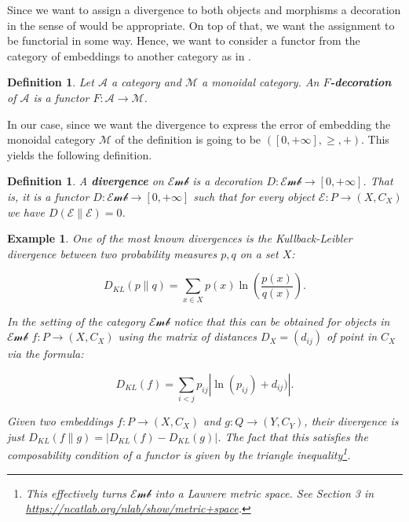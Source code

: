 \documentclass[10pt,a4paper]{elsarticle}
\newcommand{\Emb}{\mathcal{Emb}}
\newtheorem{exa}[theorem]{Example}
\newtheorem{definition}[theorem]{Definition}
\begin{document}
Since we want to assign a divergence to both objects and morphisms a decoration in the sense of  \cite{fong2015decorated,baez2021structured} would be appropriate. On top of that, we want the assignment to be functorial in some way. Hence, we want to consider a functor from the category of embeddings to another category as in \cite{AFH}. 

\begin{definition}\label{def:deco}
	Let $\mathcal{A}$ a category and $\mathcal{M}$ a monoidal category. An $F$\textbf{-decoration} of $\mathcal{A}$ is a functor $F\colon \mathcal{A}\to \mathcal{M}$.  
\end{definition}

In our case, since we want the divergence to express the error of embedding the monoidal category $\mathcal{M}$ of the definition is going to be $([0,+\infty],\geq, +)$. This yields the following definition.

\begin{definition}
	A \textbf{divergence} on $\Emb$ is a decoration $D\colon \Emb \to [0,+\infty]$. That is, it is a functor $D\colon \Emb \to [0,+\infty]$ such that for every object $\mathcal{E}\colon P\to (X,C_{X})$ we have $D(\mathcal{E}\|\mathcal{E})=0$.
\end{definition}

\begin{exa}
	One of the most known divergences is the Kullback-Leibler divergence between two probability measures $p,q$ on a set $X$:
	
	\begin{equation}
		D_{KL}(p\| q)=\sum_{x\in X}p(x)\ln\left(\frac{p(x)}{q(x)}\right).
	\end{equation}
	
	In the setting of the category $\Emb$ notice that this can be obtained for objects in $\Emb$ $f\colon P\to (X,C_{X})$ using the matrix of distances $D_{X}=(d_{ij})$ of point in $C_{X}$ via the formula:
	
	\begin{equation}
		D_{KL}(f)=\sum_{i<j}p_{ij}|\ln(p_{ij})+d_{ij})|.
	\end{equation}
	
	
	Given two embeddings $f\colon P\to (X,C_{X})$ and $g\colon Q\to(Y,C_{Y})$, their divergence is just $D_{KL}(f\| g)=|D_{KL}(f)-D_{KL}(g)|$. The fact that this satisfies the composability condition of a functor is given by the triangle inequality\footnote{This effectively turns $\Emb$ into a Lawvere metric space. See Section 3 in \url{https://ncatlab.org/nlab/show/metric+space}.}.
\end{exa}
\end{document}
